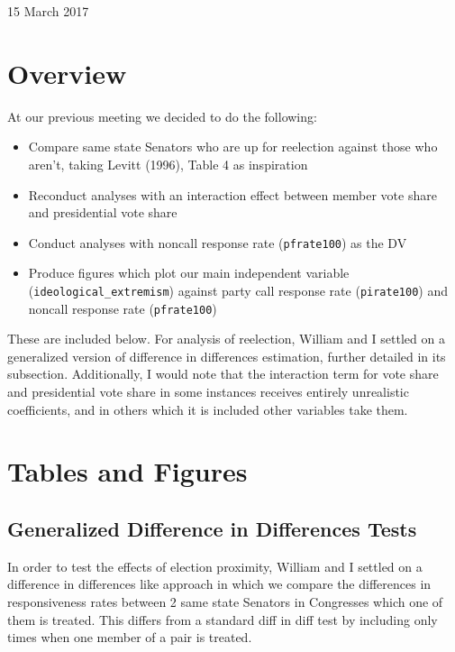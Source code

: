 \documentclass[12pt]{article}
\begin{document}
	
\begin{center}
	\Large 15 March 2017
\end{center}

\section{Overview}

At our previous meeting we decided to do the following:

\begin{itemize}
	\item Compare same state Senators who are up for reelection against those who aren't, taking Levitt (1996), Table 4 as inspiration
	
	\item Reconduct analyses with an interaction effect between member vote share and presidential vote share
	
	\item Conduct analyses with noncall response rate (\verb|pfrate100|) as the DV
	
	\item Produce figures which plot our main independent variable (\verb|ideological_extremism|) against party call response rate (\verb|pirate100|) and noncall response rate (\verb|pfrate100|)
\end{itemize}

\noindent
These are included below. For analysis of reelection, William and I settled on a generalized version of difference in differences estimation, further detailed in its subsection. Additionally, I would note that the interaction term for vote share and presidential vote share in some instances receives entirely unrealistic coefficients, and in others which it is included other variables take them.

\section{Tables and Figures}

\subsection{Generalized Difference in Differences Tests}

In order to test the effects of election proximity, William and I settled on a difference in differences like approach in which we compare the differences in responsiveness rates between 2 same state Senators in Congresses which one of them is treated. This differs from a standard diff in diff test by including only times when one member of a pair is treated. 
\end{document}
